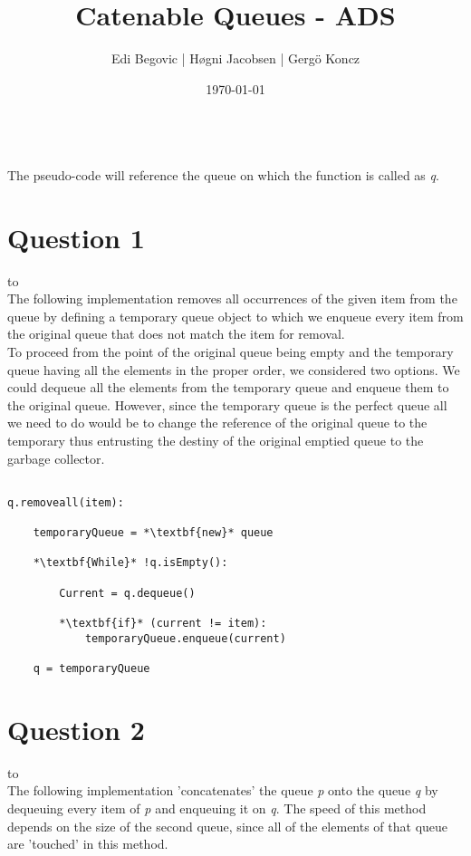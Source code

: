 \documentclass[a4paper]{article}
\title{Catenable Queues - ADS}
\author{Edi Begovic | Høgni Jacobsen | Gergö Koncz}
\date{\today}
\def\headline#1{\hbox to \hsize{\hrulefill\quad\lower.3em\hbox{#1}\quad\hrulefill}}
\begin{document}
 
\maketitle

\ \\
\noindent
The pseudo-code will reference the queue on which the function is called as \textit{q}.
\ \\
\section*{Question 1}
\headline{-} \ \\

\noindent
The following implementation removes all occurrences of the given item from the queue by defining a temporary queue
object to which we enqueue every item from the original queue that does not match the item for removal. 
\ \\

\noindent
To proceed from the point of the original queue being empty and the temporary queue having all the elements in the proper order, we considered two options. We could dequeue all the elements from the temporary queue and enqueue them to the original queue. However, since the temporary queue is the perfect queue all we need to do would be to change the reference of the original queue to the temporary thus entrusting the destiny of the original emptied queue to the garbage collector. 

\noindent
\begin{lstlisting}[escapeinside={{*}{*}}]

q.removeall(item):

    temporaryQueue = *\textbf{new}* queue

    *\textbf{While}* !q.isEmpty():

        Current = q.dequeue()
        
        *\textbf{if}* (current != item):
            temporaryQueue.enqueue(current) 
    
    q = temporaryQueue

\end{lstlisting}

\newpage
\section*{Question 2}
\headline{-} \ \\
The following implementation 'concatenates' the queue \textit{p} onto the queue \textit{q} by
dequeuing every item of \textit{p} and enqueuing it on \textit{q}. The speed of this method depends on the size of the second queue, since all of the elements of that queue are 'touched' in this method.
\ \\
\end{document}
